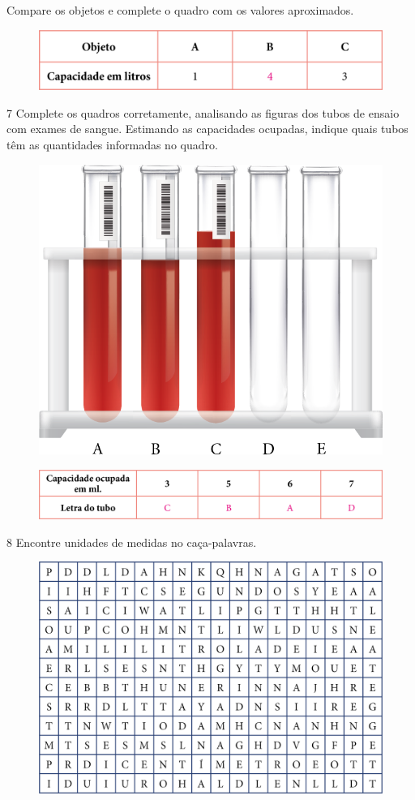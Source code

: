 Compare os objetos e complete o quadro com os valores aproximados.

\begin{figure}[htpb!]
\includegraphics[width=\textwidth]{./media/image35.png}
\end{figure}


\num{7} Complete os quadros corretamente, analisando as figuras dos tubos de
ensaio com exames de sangue. Estimando as capacidades ocupadas, indique
quais tubos têm as quantidades informadas no quadro.


\begin{figure}[H]
\centering\includegraphics[width=.4\textwidth]{./media/image36.png}
\end{figure}

\begin{figure}[H]
\includegraphics[width=\textwidth]{./media/image37.png}
\end{figure}

\num{8} Encontre unidades de medidas no caça-palavras.

\begin{figure}[H]
\centering
\includegraphics[width=.8\textwidth]{./media/image40.png}
\end{figure}

